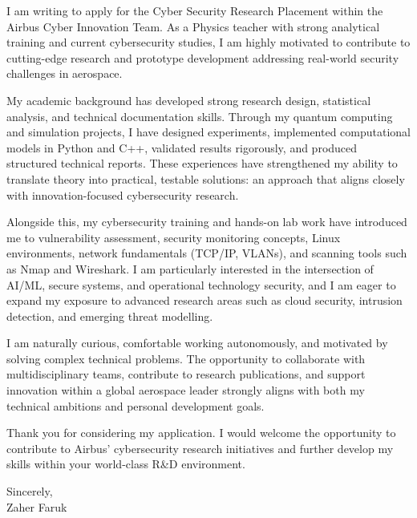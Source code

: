 \documentclass[letterpaper,11pt]{article}
\begin{document}
I am writing to apply for the Cyber Security Research Placement within the Airbus Cyber Innovation Team. As a Physics teacher with strong analytical training and current cybersecurity studies, I am highly motivated to contribute to cutting-edge research and prototype development addressing real-world security challenges in aerospace.

My academic background has developed strong research design, statistical analysis, and technical documentation skills. Through my quantum computing and simulation projects, I have designed experiments, implemented computational models in Python and C++, validated results rigorously, and produced structured technical reports. These experiences have strengthened my ability to translate theory into practical, testable solutions: an approach that aligns closely with innovation-focused cybersecurity research.

Alongside this, my cybersecurity training and hands-on lab work have introduced me to vulnerability assessment, security monitoring concepts, Linux environments, network fundamentals (TCP/IP, VLANs), and scanning tools such as Nmap and Wireshark. I am particularly interested in the intersection of AI/ML, secure systems, and operational technology security, and I am eager to expand my exposure to advanced research areas such as cloud security, intrusion detection, and emerging threat modelling.

I am naturally curious, comfortable working autonomously, and motivated by solving complex technical problems. The opportunity to collaborate with multidisciplinary teams, contribute to research publications, and support innovation within a global aerospace leader strongly aligns with both my technical ambitions and personal development goals.

Thank you for considering my application. I would welcome the opportunity to contribute to Airbus’ cybersecurity research initiatives and further develop my skills within your world-class R\&D environment.

\vspace{0.5cm}

Sincerely, \\
\vspace{0.2cm}
Zaher Faruk
\end{document}
